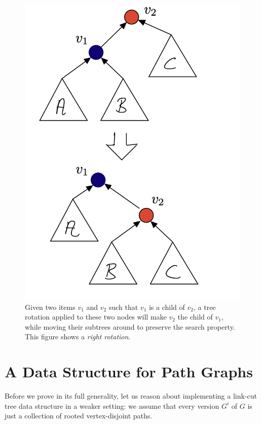\begin{figure}[H]
    \centering
    \includegraphics[scale=0.2]{./fig/TreeRotation_lectureDynamicTree.jpeg}
    \caption{Given two items $v_1$ and $v_2$ such that $v_1$ is a child of $v_2$, a tree rotation applied to these two nodes will make $v_2$ the child of $v_1$, while moving their subtrees around to preserve the search property. This figure shows a \emph{right rotation}.}
    \label{fig:binaryTreeRotation}
\end{figure}

\section{A Data Structure for Path Graphs}

Before we prove  in its full generality, let us reason about implementing a link-cut tree data structure in a weaker setting: we assume that every version $G^i$ of $G$ is just a collection of rooted vertex-disjoint paths.

